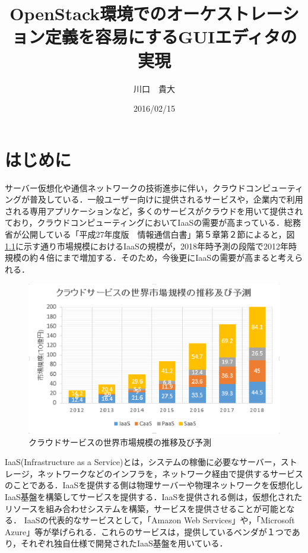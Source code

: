 \documentclass[mingoth]{kut-paper}		%
\title{OpenStack環境でのオーケストレーション定義を容易にするGUIエディタの実現}
\author{川口　貴大}
\date{2016/02/15}
\begin{document}
\maketitle

\chapter{はじめに}
%
	
	サーバー仮想化や通信ネットワークの技術進歩に伴い，クラウドコンピューティングが普及している．一般ユーザー向けに提供されるサービスや，企業内で利用される専用アプリケーションなど，多くのサービスがクラウドを用いて提供されており，クラウドコンピューティングにおいてIaaSの需要が高まっている．総務省が公開している「平成27年度版　情報通信白書」第５章第２節によると，図\ref{graf:1}に示す通り市場規模におけるIaaSの規模が，2018年時予測の段階で2012年時規模の約４倍にまで増加する．\cite{bib:1}そのため，今後更にIaaSの需要が高まると考えられる．
	\begin{figure}[H]
		\begin{center}
			\includegraphics[scale=0.8]{Document/2016IaaSDataGrafPhoto.eps}
			\caption{クラウドサービスの世界市場規模の推移及び予測}
			\label{graf:1}
		\end{center}
	\end{figure}
	
	IaaS(Infrastructure as a Service)とは，システムの稼働に必要なサーバー，ストレージ，ネットワークなどのインフラを，ネットワーク経由で提供するサービスのことである．\cite{bib:2}IaaSを提供する側は物理サーバーや物理ネットワークを仮想化しIaaS基盤を構築してサービスを提供する．IaaSを提供される側は，仮想化されたリソースを組み合わせシステムを構築，サービスを提供させることが可能となる．
	IaaSの代表的なサービスとして，「Amazon Web Services」や，「Microsoft Azure」等が挙げられる．これらのサービスは，提供しているベンダが１つであり，それぞれ独自仕様で開発されたIaaS基盤を用いている．
	
\end{document}

